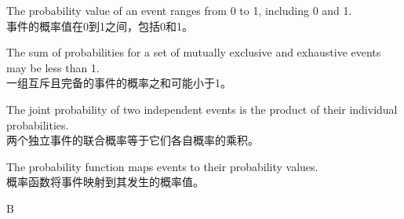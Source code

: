 \documentclass{article}
\begin{document}
        \begin{choices}
            \item The probability value of an event ranges from 0 to 1, including 0 and 1.\\
            事件的概率值在0到1之间，包括0和1。
            \item The sum of probabilities for a set of mutually exclusive and exhaustive events may be less than 1.\\
            一组互斥且完备的事件的概率之和可能小于1。
            \item The joint probability of two independent events is the product of their individual probabilities.\\
            两个独立事件的联合概率等于它们各自概率的乘积。
            \item The probability function maps events to their probability values.\\
            概率函数将事件映射到其发生的概率值。
        \end{choices}
        
        \begin{correctanswer}
        B
        \end{correctanswer}
        
\end{document}
